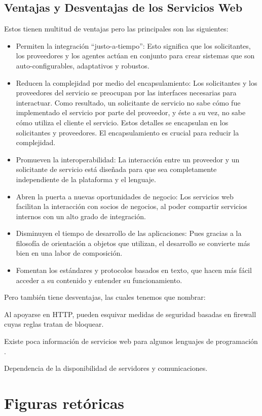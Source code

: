 \subsection{Ventajas y Desventajas de los  Servicios Web}
\label{cap:subsec:serviciosweb}
Estos tienen multitud de ventajas pero las principales son las siguientes:
\begin{itemize}
	 \item Permiten la integración “justo-a-tiempo”:  Esto significa que los solicitantes, los proveedores y los agentes actúan en conjunto para crear sistemas que son auto-configurables, adaptativos y robustos.
	\item Reducen la complejidad por medio del encapsulamiento: Los solicitantes y los proveedores del servicio se preocupan por las interfaces necesarias para interactuar. Como resultado, un solicitante de servicio no sabe cómo fue implementado el servicio por parte del proveedor, y éste a su vez, no sabe cómo utiliza el cliente el servicio. Estos detalles se encapsulan en los solicitantes y proveedores. El encapsulamiento es crucial para reducir la complejidad.
	\item Promueven la interoperabilidad: La interacción entre un proveedor y un solicitante de servicio está diseñada para que sea completamente independiente de la plataforma y el lenguaje. 
	\item Abren la puerta a nuevas oportunidades de negocio: Los servicios web facilitan la interacción con socios de negocios, al poder compartir servicios internos con un alto grado de integración.
	\item Disminuyen el tiempo de desarrollo de las aplicaciones: Pues gracias a la filosofía de orientación a objetos que utilizan, el desarrollo se convierte más bien en una labor de composición.
	\item Fomentan los estándares y protocolos basados en texto, que hacen más fácil acceder a su contenido y entender su funcionamiento.
\end{itemize}
Pero también tiene desventajas, las cuales tenemos que nombrar:
	\item Al apoyarse en HTTP, pueden esquivar medidas de seguridad basadas en firewall cuyas reglas tratan de bloquear.
	\item Existe poca información de servicios web para algunos lenguajes de programación .
	\item Dependencia de la disponibilidad de servidores y comunicaciones.

\section{Figuras retóricas}

